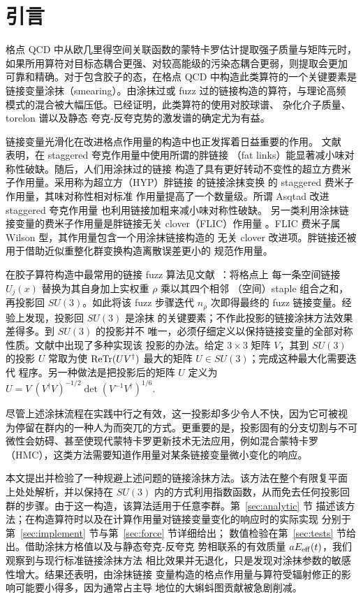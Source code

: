 \section{引言}
格点 QCD 中从欧几里得空间关联函数的蒙特卡罗估计提取强子质量与矩阵元时，
如果所用算符对目标态耦合更强、对较高能级的污染态耦合更弱，则提取会更加
可靠和精确。对于包含胶子的态，在格点 QCD 中构造此类算符的一个关键要素是
链接变量涂抹（smearing）。由涂抹过或 fuzz 过的链接构造的算符，与理论高频
模式的混合被大幅压低。已经证明，此类算符的使用对胶球谱\cite{colin2}、
杂化介子质量\cite{hybrids,jkm1}、torelon 谱\cite{torelons}以及静态
夸克-反夸克势的激发谱\cite{jkm2}的确定尤为有益。

链接变量光滑化在改进格点作用量的构造中也正发挥着日益重要的作用。
文献~\cite{fat1} 表明，在 staggered 夸克作用量中使用所谓的胖链接
（fat links）能显著减小味对称性破缺。随后，人们用涂抹过的链接\cite{fat2}
构造了具有更好转动不变性的超立方费米子作用量。采用称为超立方（HYP）胖链接
的链接涂抹变换\cite{hyp} 的 staggered 费米子作用量，其味对称性相对标准
作用量提高了一个数量级。所谓 Asqtad 改进 staggered 夸克作用量%
\cite{asqtad1,asqtad2,asqtad3} 也利用链接加粗来减小味对称性破缺。
另一类利用涂抹链接变量的费米子作用量是胖链接无关 clover（FLIC）作用量%
\cite{flic}。FLIC 费米子属 Wilson 型，其作用量包含一个用涂抹链接构造的
无关 clover 改进项。胖链接还被用于借助近似重整化群变换构造离散误差更小的
规范作用量\cite{fatgauge}。

在胶子算符构造中最常用的链接 fuzz 算法见文献~\cite{APEsmear}：将格点上
每一条空间链接 $U_j(x)$ 替换为其自身加上实权重 $\rho$ 乘以其四个相邻
（空间）staple 组合之和，再投影回 $SU(3)$。如此将该 fuzz 步骤迭代
$n_\rho$ 次即得最终的 fuzz 链接变量。经验上发现，投影回 $SU(3)$ 是涂抹
的关键要素；不作此投影的链接涂抹方法效果差得多。到 $SU(3)$ 的投影并不
唯一，必须仔细定义以保持链接变量的全部对称性质。文献中出现了多种实现该
投影的办法。给定 $3\times 3$ 矩阵 $V$，其到 $SU(3)$ 的投影 $U$ 常取为使
$\mbox{ReTr}(UV^\dagger)$ 最大的矩阵 $U\in SU(3)$；完成这种最大化需要迭代
程序。另一种做法\cite{su3projectA}是把投影后的矩阵 $U$ 定义为
$ U = V\ (V^\dagger V)^{-1/2} \det(V^{-1}V^\dagger)^{1/6}.$

尽管上述涂抹流程在实践中行之有效，这一投影却多少令人不快，因为它可被视
为停留在群内的一种人为而突兀的方式。更重要的是，投影固有的分支切割与不可
微性会妨碍、甚至使现代蒙特卡罗更新技术无法应用，例如混合蒙特卡罗
（HMC）\cite{hmc}，这类方法需要知道作用量对某条链接变量微小变化的响应。

本文提出并检验了一种规避上述问题的链接涂抹方法。该方法在整个有限复平面
上处处解析，并以保持在 $SU(3)$ 内的方式利用指数函数，从而免去任何投影回
群的步骤。由于这一构造，该算法适用于任意李群。第~\ref{sec:analytic} 节
描述该方法；在构造算符时以及在计算作用量对链接变量变化的响应时的实际实现
分别于第~\ref{sec:implement} 节与第~\ref{sec:force} 节详细给出；
数值检验在第~\ref{sec:tests} 节给出。借助涂抹方格值以及与静态夸克-反夸克
势相联系的有效质量 $aE_{\rm eff}(t)$，我们观察到与现行标准链接涂抹方法
相比效果并无退化，只是发现对涂抹参数的敏感性增大。结果还表明，由涂抹链接
变量构造的格点作用量与算符受辐射修正的影响可能要小得多，因为通常占主导
地位的大蝌蚪图贡献被急剧削减。
